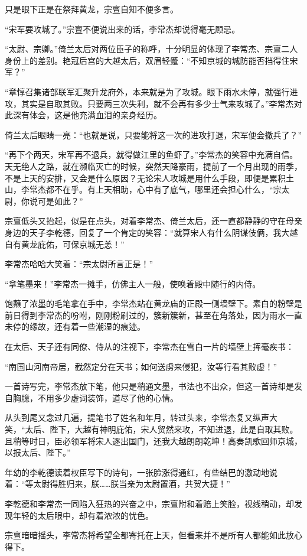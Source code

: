 只是眼下正是在祭拜黄龙，宗亶自知不便多言。

“宋军要攻城了。”宗亶不便说出来的话，李常杰却说得毫无顾忌。

“太尉、宗卿。”倚兰太后对两位臣子的称呼，十分明显的体现了李常杰、宗亶二人身份上的差别。艳冠后宫的大越太后，双眉轻蹙：“不知京城的城防能否挡得住宋军？”

“章惇召集诸部联军汇聚升龙府外，本来就是为了攻城。眼下雨水未停，就强行进攻，其实是自取其败。只要两三次失利，就不会再有多少士气来攻城了。”李常杰对此深有体会，这是他充满血泪的亲身经历。

倚兰太后眼睛一亮：“也就是说，只要能将这一次的进攻打退，宋军便会撤兵了？”

“再下个两天，宋军再不退兵，就得做江里的鱼虾了。”李常杰的笑容中充满自信。天无绝人之路，就在濒临灭亡的时候，突然天降豪雨，提前了一个月出现的雨季，不是上天的安排，又会是什么原因？无论宋人攻城是用什么手段，即便是累积土山，李常杰都不在乎。有上天相助，心中有了底气，哪里还会担心什么，“宗太尉，你说可是如此？”

宗亶低头又抬起，似是在点头，对着李常杰、倚兰太后，还一直都静静的守在母亲身边的天子李乾德，回复了一个肯定的笑容：“就算宋人有什么阴谋伎俩，我大越自有黄龙庇佑，可保京城无恙！”

李常杰哈哈大笑着：“宗太尉所言正是！”

“拿笔墨来！”李常杰一摊手，仿佛主人一般，使唤着殿中随行的内侍。

饱蘸了浓墨的毛笔拿在手中，李常杰站在黄龙庙的正殿一侧墙壁下。素白的粉壁是前日得到李常杰的吩咐，刚刚粉刷过的，簇新簇新，甚至在角落处，因为雨水一直未停的缘故，还有着一些潮湿的痕迹。

在太后、天子还有同僚、侍从的注视下，李常杰在雪白一片的墙壁上挥毫疾书：

“南国山河南帝居，截然定分在天书；如何送虏来侵犯，汝等行看其败虚！”

一首诗写完，李常杰放下笔，他只是稍通文墨，书法也不出众，但这一首诗却是发自胸臆，不用多少虚词装饰，道尽了他的心情。

从头到尾又念过几遍，提笔书了姓名和年月，转过头来，李常杰复又纵声大笑，“太后、陛下，大越有神明庇佑，宋人贸然来攻，不知进退，此是自取其败。且稍等时日，臣必领军将宋人逐出国门，还我大越朗朗乾坤！高奏凯歌回师京城，以报太后、陛下。”

年幼的李乾德读着权臣写下的诗句，一张脸涨得通红，有些结巴的激动地说着：“等太尉得胜归来，朕……朕当亲为太尉置酒，共贺大捷！”

李乾德和李常杰一同陷入狂热的兴奋之中，宗亶附和着赔上笑脸，视线稍动，却发现年轻的太后眼中，却有着浓浓的忧色。

宗亶暗暗摇头，李常杰将希望全都寄托在上天，但看来并不是所有人都能如此放心得下。

